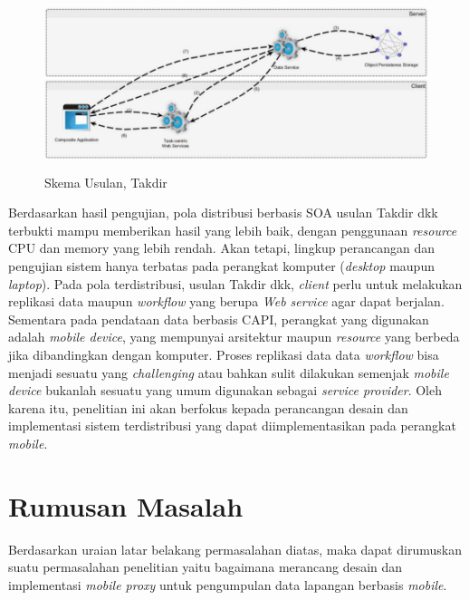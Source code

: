 \begin{figure}
    \centering
    \includegraphics[height=5cm]{images/Takdir-Distributed-SOA}
    \caption{Skema Usulan, Takdir}
    \label{fig:takdir-soa}
\end{figure}

Berdasarkan hasil pengujian, pola distribusi berbasis SOA usulan Takdir dkk terbukti mampu memberikan hasil yang lebih baik, dengan penggunaan \textit{resource} CPU dan memory yang lebih rendah. Akan tetapi, lingkup perancangan dan pengujian sistem hanya terbatas pada perangkat komputer (\textit{desktop} maupun \textit{laptop}). Pada pola terdistribusi, usulan Takdir dkk, \textit{client} perlu untuk melakukan replikasi data maupun \textit{workflow} yang berupa \textit{Web service} agar dapat berjalan. Sementara pada pendataan data berbasis CAPI, perangkat yang digunakan adalah \textit{mobile device}, yang mempunyai arsitektur maupun \textit{resource} yang berbeda jika dibandingkan dengan komputer. Proses replikasi data data \textit{workflow} bisa menjadi sesuatu yang \textit{challenging} atau bahkan sulit dilakukan semenjak \textit{mobile device} bukanlah sesuatu yang umum digunakan sebagai \textit{service provider}.	Oleh karena itu, penelitian ini akan berfokus kepada perancangan desain dan implementasi sistem terdistribusi yang  dapat diimplementasikan pada perangkat \textit{mobile}.

\section{Rumusan Masalah}
Berdasarkan uraian latar belakang permasalahan diatas, maka dapat dirumuskan suatu permasalahan penelitian yaitu bagaimana merancang desain dan implementasi \textit{mobile proxy} untuk pengumpulan data lapangan berbasis \textit{mobile}.

